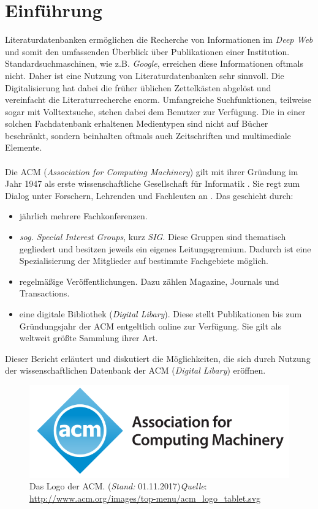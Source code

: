 \documentclass[
	ngerman,
	parskip=half,
	headsepline,
	fontsize=12pt,
	DIV=13,
	listof=leveldown,
	]{scrreprt}
\begin{document}
	\chapter{Einführung}	
	Literaturdatenbanken ermöglichen die Recherche von Informationen im \textit{Deep Web} und somit den umfassenden Überblick über Publikationen einer Institution. Standardsuchmaschinen, wie z.B. \textit{Google}, erreichen diese Informationen oftmals nicht. Daher ist eine Nutzung von Literaturdatenbanken sehr sinnvoll. Die Digitalisierung hat dabei die früher üblichen Zettelkästen abgelöst und vereinfacht die Literaturrecherche enorm. Umfangreiche Suchfunktionen, teilweise sogar mit Volltextsuche, stehen dabei dem Benutzer zur Verfügung. Die in einer solchen Fachdatenbank erhaltenen Medientypen sind nicht auf Bücher beschränkt, sondern beinhalten oftmals auch Zeitschriften und multimediale Elemente. \cite{resource:wld}
	\ \\
	\ \\
	Die ACM (\textit{Association for Computing Machinery}) gilt mit ihrer Gründung im Jahr 1947 als erste wissenschaftliche Gesellschaft für Informatik \cite{resource:wacm}. Sie regt zum Dialog unter Forschern, Lehrenden und Fachleuten an \cite{resource:aacm}. Das geschieht durch:
\begin{itemize}
\item jährlich mehrere Fachkonferenzen.
\item \textit{sog. Special Interest Groups}, kurz \textit{SIG}. Diese Gruppen sind thematisch gegliedert und besitzen jeweils ein eigenes Leitungsgremium. Dadurch ist eine Spezialisierung der Mitglieder auf bestimmte Fachgebiete möglich.
\item regelmäßige Veröffentlichungen. Dazu zählen Magazine, Journals und Transactions.
\item eine digitale Bibliothek (\textit{Digital Libary}). Diese stellt Publikationen bis zum Gründungsjahr der ACM entgeltlich online zur Verfügung. Sie gilt als weltweit größte Sammlung ihrer Art.
\end{itemize}
Dieser Bericht erläutert und diskutiert die Möglichkeiten, die sich durch Nutzung der wissenschaftlichen Datenbank der ACM (\textit{Digital Libary}) eröffnen.
\ \\
\begin{figure}[ht]
\begin{minipage}[b]{0.47\linewidth}
\centering
\includegraphics[width=\textwidth]{img/acmLogo.PNG}
\end{minipage}
\caption{Das Logo der ACM. (\textit{Stand:} 01.11.2017)\newline \textit{Quelle}: \url{http://www.acm.org/images/top-menu/acm_logo_tablet.svg}}
\end{figure}
\end{document}
